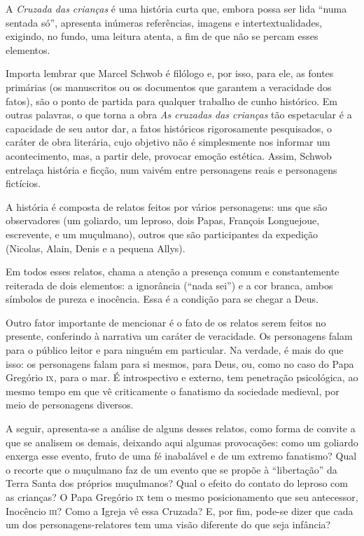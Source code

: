 A \textit{Cruzada das crianças} é uma história curta que, embora possa ser lida
``numa sentada só'', apresenta inúmeras referências, imagens e
intertextualidades, exigindo, no fundo, uma leitura atenta, a fim de que
não se percam esses elementos.

Importa lembrar que Marcel Schwob é filólogo e, por isso, para ele, as
fontes primárias (os manuscritos ou os documentos que garantem a
veracidade dos fatos), são o ponto de partida para qualquer trabalho de
cunho histórico. Em outras palavras, o que torna a obra \textit{As cruzadas das
crianças} tão espetacular é a capacidade de seu autor dar, a fatos
históricos rigorosamente pesquisados, o caráter de obra literária, cujo
objetivo não é simplesmente nos informar um acontecimento, mas, a partir
dele, provocar emoção estética. Assim, Schwob entrelaça história e
ficção, num vaivém entre personagens reais e personagens fictícios.

A história é composta de relatos feitos por vários personagens: uns que
são observadores (um goliardo, um leproso, dois Papas, François
Longuejoue, escrevente, e um muçulmano), outros que são participantes da
expedição (Nicolas, Alain, Denis e a pequena Allys).

Em todos esses relatos, chama a atenção a presença comum e
constantemente reiterada de dois elementos: a ignorância (``nada sei'')
e a cor branca, ambos símbolos de pureza e inocência. Essa é a condição
para se chegar a Deus.

Outro fator importante de mencionar é o fato de os relatos serem feitos
no presente, conferindo à narrativa um caráter de veracidade. Os
personagens falam para o público leitor e para ninguém em particular. Na
verdade, é mais do que isso: os personagens falam para si mesmos, para
Deus, ou, como no caso do Papa Gregório \textsc{ix}, para o mar. É introspectivo
e externo, tem penetração psicológica, ao mesmo tempo em que vê
criticamente o fanatismo da sociedade medieval, por meio de personagens
diversos.

A seguir, apresenta-se a análise de alguns desses relatos, como forma de
convite a que se analisem os demais, deixando aqui algumas provocações:
como um goliardo enxerga esse evento, fruto de uma fé inabalável e de um
extremo fanatismo? Qual o recorte que o muçulmano faz de um evento que
se propõe à ``libertação'' da Terra Santa dos próprios muçulmanos? Qual
o efeito do contato do leproso com as crianças? O Papa Gregório \textsc{ix} tem o
mesmo posicionamento que seu antecessor, Inocêncio \textsc{iii}? Como a Igreja vê
essa Cruzada? E, por fim, pode-se dizer que cada um dos
personagens-relatores tem uma visão diferente do que seja infância?

